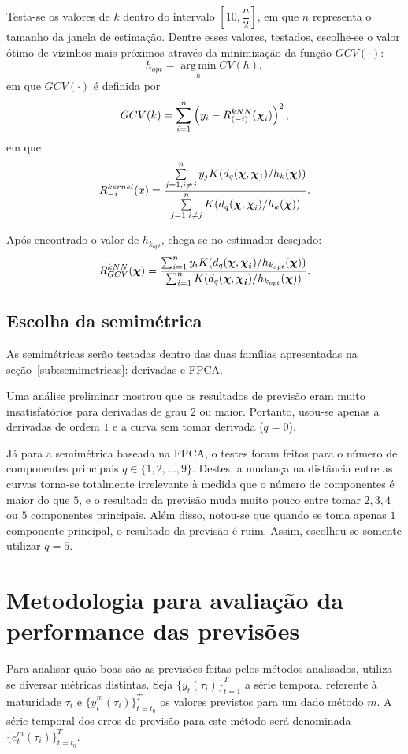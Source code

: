 \documentclass[
	12pt,				%
	openright,			%
	oneside,			%
	a4paper,			%
	english,			%
	brazil				%
	]{dissertacao-ufrgs-abntex2}
\begin{document}
\begin{description}
Testa-se os valores de $k$ dentro do intervalo $[10,\dfrac{n}{2}]$, em que $n$ representa o tamanho da janela de estimação. Dentre esses valores, testados, escolhe-se o valor ótimo de vizinhos mais próximos através da minimização da função $GCV(\cdot)$:
\[h_{opt} = \operatorname*{arg\,min}_h CV(h),\]
em que $GCV(\cdot)$ é definida por
\[
GCV(k) = \sum \limits_{i=1}^n \left(  y_i - R_{(-i)}^{kNN}(\boldsymbol{\chi}_i)  \right)^2, 
\]
em que
\[
R_{-i}^{kernel}(x)=\frac{\sum \limits_{j=1,i \neq j}^{n}y_{j}K(d_{q}(\boldsymbol{\chi},\boldsymbol{\chi}_{j})/h_k(\boldsymbol{\chi}))}{\sum \limits_{j=1,i \neq j}^{n}K(d_{q}(\boldsymbol{\chi},\boldsymbol{\chi}_{i})/h_k(\boldsymbol{\chi}))}.
\]


Após encontrado o valor de $h_{k_{opt}}$, chega-se no estimador desejado:
\[
R_{GCV}^{kNN}(\boldsymbol{\chi})=\dfrac{\sum_{i=1}^{n}y_{i}K(d_{q}(\boldsymbol{\chi},\boldsymbol{\boldsymbol{\chi}_{i}})/h_{k_{opt}}(\boldsymbol{\chi}))}{\sum_{i=1}^{n}K(d_{q}(\boldsymbol{\chi},\boldsymbol{\boldsymbol{\chi}_{i}})/h_{k_{opt}}(\boldsymbol{\chi}))}.
\]


\end{description}


\subsection{Escolha da semimétrica}

As semimétricas serão testadas dentro das duas famílias apresentadas na seção~\ref{sub:semimetricas}: derivadas e FPCA. 

Uma análise preliminar mostrou que os resultados de previsão eram muito insatisfatórios para derivadas de grau $2$ ou maior. Portanto, usou-se apenas a derivadas de ordem $1$ e a curva sem tomar derivada ($q=0$).

Já para a semimétrica baseada na FPCA, o testes foram feitos para o número de componentes principais $q \in \{1, 2, ..., 9\}$. Destes, a mudança na distância entre as curvas torna-se totalmente irrelevante à medida que o número de componentes é maior do que $5$, e o resultado da previsão muda muito pouco entre tomar $2,3,4$ ou $5$ componentes principais. Além disso, notou-se que quando se toma apenas $1$ componente principal, o resultado da previsão é ruim. Assim, escolheu-se somente utilizar $q=5$.


\section{Metodologia para avaliação da performance das previsões}

Para analisar quão boas são as previsões feitas pelos métodos analisados, utiliza-se diversar métricas distintas. Seja $\{y_{t}(\tau_i)\}_{t=1}^T$ a série temporal referente à maturidade $\tau_i$ e $\{\hat{y}_{t}^m(\tau_i)\}_{t=t_0}^T$ os valores previstos para um dado método $m$. A série temporal dos erros de previsão para este método será denominada $\{e_{t}^m(\tau_i)\}_{t=t_0}^T$.
\end{document}
